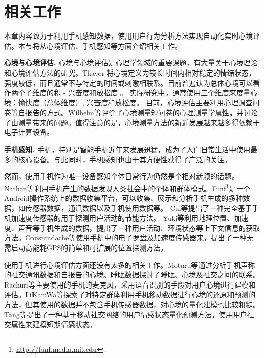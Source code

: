 \section{相关工作}\label{mood:relatedwork}

本章内容致力于利用手机感知数据，使用用户行为分析方法实现自动化实时心境评估。本节将从心境评估、手机感知等方面介绍相关工作。

\textbf{心境与心境评估.} 心境与心境评估是心理学领域的重要课题，有大量关于心境理论和心境评估方法的研究。Thayer \cite{mood} 将心境定义为较长时间内相对稳定的情绪状态，强度较低，而且通常不与特定的时间或刺激相联系。目前普遍认为总体心境可以看作两个子维度的积 - 兴奋度和放松度\cite{assessmood} \cite{mooddimension}。 实际研究中，通常使用三个维度来度量心境：愉快度（总体维度）, 兴奋度和放松度\cite{assessmood}。
目前，心境评估主要利用心理调查问卷等自报告的方式\cite{childmood}。Wilhelm等\cite{assessmood}评价了心境测量短问卷的心理测量学属性，并讨论了由测量带来的问题。值得注意的是，心境测量方法的新近发展越来越多得依赖于电子计算设备\cite{mobilephoneassessmood}\cite{silk2011daily}。

\textbf{手机感知.} 手机，特别是智能手机近年来发展迅猛，成为了人们日常生活中使用最多的核心设备。与此同时，手机感知也由于其方便性获得了广泛的关注\cite{surveyofsensor}\cite{myHealth}。

然而，使用手机作为唯一设备感知个体日常行为仍然是个相对新颖的话题。Nathan等\cite{realitymining}利用手机产生的数据发现人类社会中的个体和群体模式。Funf\footnote{\url{http://funf.media.mit.edu}}是一个Android操作系统上的数据收集平台，可以收集、展示和分析手机生成的多种数据，如传感器数据，通讯数据以及手机使用数据等\cite{aharonyfunf}\cite{Bai:2012:YGS:2442691.2442720}。
Cui等\cite{jianc}提出了一种完全基于手机加速度传感器的用于探测用户活动的节能方法。 Yuki等\cite{activity}利用地理位置、加速度、声音等手机生成的数据，提出了一种用户活动、环境状态等上下文信息的获取方法。Constandache等\cite{localization}使用手机中的电子罗盘及加速度传感器来，提出了一种无需启动高能耗GPS的简单和可扩展的位置探测方法。

使用手机进行心境评估方面还没有太多的相关工作。Moturu等\cite{moodsleepsocial}通过分析手机声称的社交通讯数据和自报告的心境、睡眠数据探讨了睡眠、心境及社交之间的联系。Rachuri等\cite{rachuri2010emotionsense}主要使用的手机的麦克风，采用语音识别的手段对用户心境进行建模和评估。LiKamWa等\cite{likamwa2011can}探索了对特定群体利用手机移动数据进行心境的还原和预测的方法，但其使用的数据并不包含手机传感器数据，对心境的量化建模也比较粗糙。Tang等\cite{socialEmotion}提出了一种基于移动社交网络的用户情感状态量化预测方法，使用用户社交属性来建模短期情感状态。


